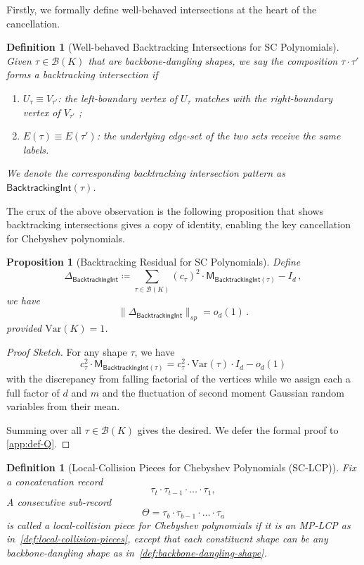 \documentclass[12pt]{article}
\newcommand{\Var}{\mathrm{Var}}
\newtheorem{proposition}[theorem]{Proposition}
\newtheorem{definition}[theorem]{Definition}
\newtheorem{remark}[theorem]{Remark}
\newcommand{\calB}{\mathcal{B}}
\newcommand{\cm}{\mathsf{M} }
\newcommand{\bti}{\mathsf{BacktrackingInt}}
\begin{document}
Firstly, we formally define well-behaved intersections at the heart of the cancellation.
\begin{definition}[Well-behaved Backtracking Intersections for SC Polynomials]
	Given $\tau \in \calB(K)$ that are backbone-dangling shapes, we say the composition $\tau\cdot \tau'$ forms a backtracking intersection if \begin{enumerate}
		\item $U_{\tau} \equiv V_{\tau'} $: the left-boundary vertex of $U_\tau$ matches with the right-boundary vertex of $V_{\tau'}$ ;
		\item $E(\tau) \equiv E(\tau')$: the underlying edge-set of the two sets receive the same labels.  
	\end{enumerate}
	We denote the corresponding backtracking intersection pattern as $\bti(\tau)$.
\end{definition}
The crux of the above observation is the following proposition that shows backtracking intersections gives a copy of identity, enabling the key cancellation for Chebyshev polynomials. 

\begin{proposition}[Backtracking Residual for SC Polynomials] \label{prop:backtracking-sc}
	Define \[ 
	\Delta_{\bti} \coloneqq  \sum _{\tau \in \calB(K)} (c_\tau)^2 \cdot  \cm_{\bti(\tau)} - I_d \,,	\]
	we have \[ 
	\|\Delta_{\bti}\|_{sp} = o_d(1)\,.
	\]
	provided $\Var(K)=1$.
\end{proposition} 
\begin{proof}[Proof Sketch]
For any shape $\tau$, we have \[ 
c_\tau^2 \cdot \cm_{\bti(\tau)}  = c_\tau^2 \cdot  \Var(\tau) \cdot I_d -o_d(1)
\]	
with the discrepancy from falling factorial of the vertices while we assign each a full factor of $d$ and $m$ and the fluctuation of second moment Gaussian random variables from their mean. 

Summing over all $\tau\in \calB(K)$ gives the desired.
 We defer the formal proof to \cref{app:def-Q}.
\end{proof}

\begin{definition}[Local-Collision Pieces for Chebyshev Polynomials (SC-LCP)]
\label{def:SC-LCP}
Fix a concatenation record
\[
    \tau_t\cdot \tau_{t-1}\cdot \dots \cdot \tau_1,
\]
A consecutive sub-record
\[
    \Theta
    =
    \tau_b\cdot \tau_{b-1}\cdot \dots \cdot \tau_a
\]
is called a \emph{local-collision piece} for Chebyshev polynomials if it is an MP-LCP as in~\cref{def:local-collision-pieces}, except that each constituent shape can be any backbone-dangling shape as in~\cref{def:backbone-dangling-shape}.

\end{definition}
\end{document}
